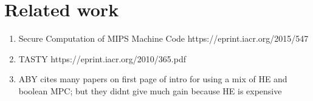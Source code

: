 \section{Related work}
\label{sec:related}

\begin{enumerate}
\item Secure Computation of MIPS Machine Code https://eprint.iacr.org/2015/547
\item TASTY https://eprint.iacr.org/2010/365.pdf
\item ABY cites many papers on first page of intro for using a mix of HE and boolean MPC; but they didnt give much gain because HE is expensive

\end{enumerate}